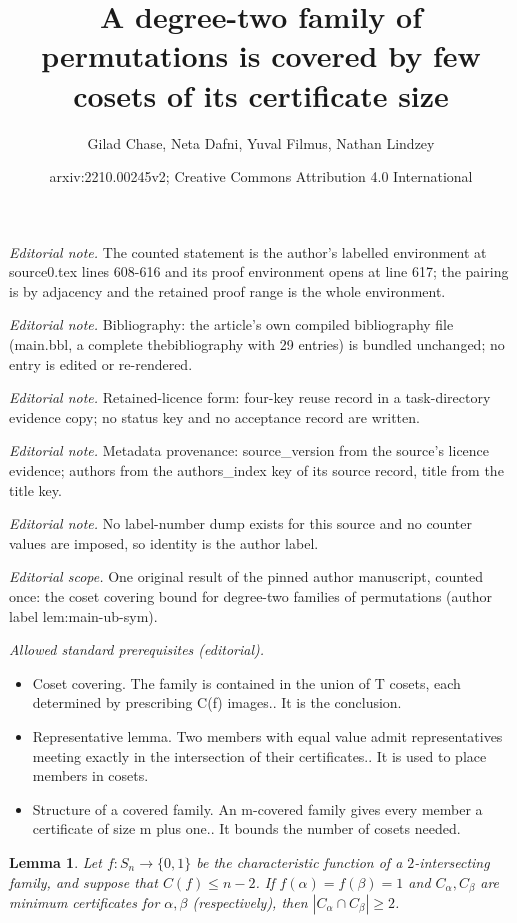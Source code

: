 \documentclass[10pt,a4paper]{article}
\title{A degree-two family of permutations is covered by few cosets of its certificate size}
\author{Gilad Chase, Neta Dafni, Yuval Filmus, Nathan Lindzey}
\date{arxiv:2210.00245v2; Creative Commons Attribution 4.0 International}
\newtheorem{lemma}[theorem]{Lemma}
\theoremstyle{definition}
\begin{document}
\maketitle
\noindent\textit{Editorial note.} The counted statement is the author's labelled environment at source0.tex lines 608-616 and its proof environment opens at line 617; the pairing is by adjacency and the retained proof range is the whole environment.\par\medskip
\noindent\textit{Editorial note.} Bibliography: the article's own compiled bibliography file (main.bbl, a complete thebibliography with 29 entries) is bundled unchanged; no entry is edited or re-rendered.\par\medskip
\noindent\textit{Editorial note.} Retained-licence form: four-key reuse record in a task-directory evidence copy; no status key and no acceptance record are written.\par\medskip
\noindent\textit{Editorial note.} Metadata provenance: source\_version from the source's licence evidence; authors from the authors\_index key of its source record, title from the title key.\par\medskip
\noindent\textit{Editorial note.} No label-number dump exists for this source and no counter values are imposed, so identity is the author label.\par\medskip
\noindent\textit{Editorial scope.} One original result of the pinned author manuscript, counted once: the coset covering bound for degree-two families of permutations (author label lem:main-ub-sym).\par\medskip
\noindent\textit{Allowed standard prerequisites (editorial).}\begin{itemize}
\item Coset covering. The family is contained in the union of T cosets, each determined by prescribing C(f) images.. It is the conclusion.
\item Representative lemma. Two members with equal value admit representatives meeting exactly in the intersection of their certificates.. It is used to place members in cosets.
\item Structure of a covered family. An m-covered family gives every member a certificate of size m plus one.. It bounds the number of cosets needed.
\end{itemize}\medskip

\begin{lemma} \label{lem:2-int-coset-sym}
Let $f\colon S_n \to \{0,1\}$ be the characteristic function of a $2$-intersecting family, and suppose that $C(f) \leq n-2$. If $f(\alpha) = f(\beta) = 1$ and $C_\alpha,C_\beta$ are minimum certificates for $\alpha,\beta$ (respectively), then $|C_\alpha \cap C_\beta| \geq 2$.
\end{lemma}
\end{document}
